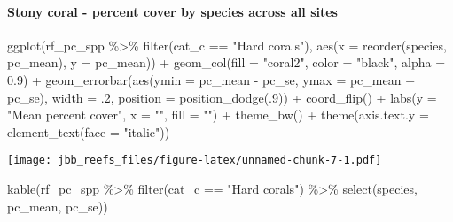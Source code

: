 \documentclass[
]{article}
\newenvironment{Shaded}{\begin{snugshade}}{\end{snugshade}}
\newcommand{\AttributeTok}[1]{\textcolor[rgb]{0.77,0.63,0.00}{#1}}
\newcommand{\DecValTok}[1]{\textcolor[rgb]{0.00,0.00,0.81}{#1}}
\newcommand{\FloatTok}[1]{\textcolor[rgb]{0.00,0.00,0.81}{#1}}
\newcommand{\FunctionTok}[1]{\textcolor[rgb]{0.00,0.00,0.00}{#1}}
\newcommand{\NormalTok}[1]{#1}
\newcommand{\SpecialCharTok}[1]{\textcolor[rgb]{0.00,0.00,0.00}{#1}}
\newcommand{\StringTok}[1]{\textcolor[rgb]{0.31,0.60,0.02}{#1}}
\begin{document}
\hypertarget{stony-coral---percent-cover-by-species-across-all-sites}{%
\paragraph{Stony coral - percent cover by species across all
sites}\label{stony-coral---percent-cover-by-species-across-all-sites}}

\begin{Shaded}
\begin{Highlighting}[]
\FunctionTok{ggplot}\NormalTok{(rf\_pc\_spp }\SpecialCharTok{\%\textgreater{}\%}
         \FunctionTok{filter}\NormalTok{(cat\_c }\SpecialCharTok{==} \StringTok{"Hard corals"}\NormalTok{),}
       \FunctionTok{aes}\NormalTok{(}\AttributeTok{x =} \FunctionTok{reorder}\NormalTok{(species, pc\_mean), }\AttributeTok{y =}\NormalTok{ pc\_mean)) }\SpecialCharTok{+}
  \FunctionTok{geom\_col}\NormalTok{(}\AttributeTok{fill =} \StringTok{"coral2"}\NormalTok{, }\AttributeTok{color =} \StringTok{"black"}\NormalTok{, }\AttributeTok{alpha =} \FloatTok{0.9}\NormalTok{) }\SpecialCharTok{+}
  \FunctionTok{geom\_errorbar}\NormalTok{(}\FunctionTok{aes}\NormalTok{(}\AttributeTok{ymin =}\NormalTok{ pc\_mean }\SpecialCharTok{{-}}\NormalTok{ pc\_se, }\AttributeTok{ymax =}\NormalTok{ pc\_mean }\SpecialCharTok{+}\NormalTok{ pc\_se), }\AttributeTok{width =}\NormalTok{ .}\DecValTok{2}\NormalTok{,}
                 \AttributeTok{position =} \FunctionTok{position\_dodge}\NormalTok{(.}\DecValTok{9}\NormalTok{)) }\SpecialCharTok{+}
  \FunctionTok{coord\_flip}\NormalTok{() }\SpecialCharTok{+}
  \FunctionTok{labs}\NormalTok{(}\AttributeTok{y =} \StringTok{"Mean percent cover"}\NormalTok{, }\AttributeTok{x =} \StringTok{""}\NormalTok{, }\AttributeTok{fill =} \StringTok{""}\NormalTok{) }\SpecialCharTok{+}
  \FunctionTok{theme\_bw}\NormalTok{() }\SpecialCharTok{+}
  \FunctionTok{theme}\NormalTok{(}\AttributeTok{axis.text.y =} \FunctionTok{element\_text}\NormalTok{(}\AttributeTok{face =} \StringTok{"italic"}\NormalTok{))}
\end{Highlighting}
\end{Shaded}

\texttt{[image: jbb\_reefs\_files/figure-latex/unnamed-chunk-7-1.pdf]}

\begin{Shaded}
\begin{Highlighting}[]
\FunctionTok{kable}\NormalTok{(rf\_pc\_spp }\SpecialCharTok{\%\textgreater{}\%} \FunctionTok{filter}\NormalTok{(cat\_c }\SpecialCharTok{==} \StringTok{"Hard corals"}\NormalTok{) }\SpecialCharTok{\%\textgreater{}\%} \FunctionTok{select}\NormalTok{(species, pc\_mean, pc\_se))}
\end{Highlighting}
\end{Shaded}
\end{document}

